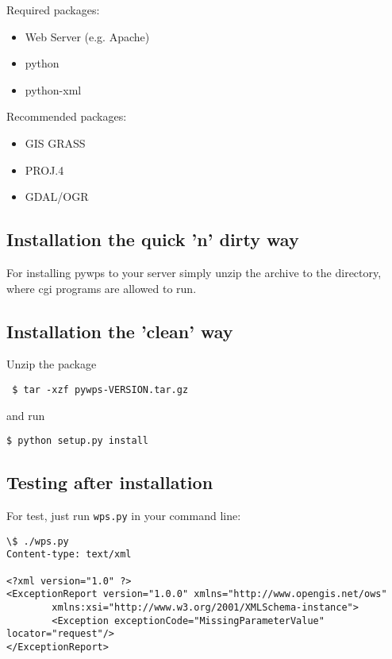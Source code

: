 \documentclass[a4paper,11pt]{article}
\begin{document}
    Required packages:
     
    \begin{itemize}
        \item Web Server (e.g. Apache) 
        \item python 
        \item python-xml 
    \end{itemize}
     
    Recommended packages:
     
    \begin{itemize}
        \item GIS GRASS 
        \item PROJ.4 
        \item GDAL/OGR 
    \end{itemize}
     
    \subsection{Installation the quick 'n' dirty way}
    For installing pywps to your server simply unzip the archive to the
    directory, where cgi programs are allowed to run. 

    \subsection{Installation the 'clean' way}
    Unzip the package 
    \begin{verbatim}
 $ tar -xzf pywps-VERSION.tar.gz
    \end{verbatim}
    and run 
    \begin{verbatim}
$ python setup.py install
    \end{verbatim}
    
    \subsection{Testing after installation}
    For test, just run
    \texttt{wps.py} in your command line:
     
    \begin{verbatim}
\$ ./wps.py
Content-type: text/xml

<?xml version="1.0" ?>
<ExceptionReport version="1.0.0" xmlns="http://www.opengis.net/ows" 
        xmlns:xsi="http://www.w3.org/2001/XMLSchema-instance">
        <Exception exceptionCode="MissingParameterValue" locator="request"/>
</ExceptionReport>
    \end{verbatim}
\end{document}
